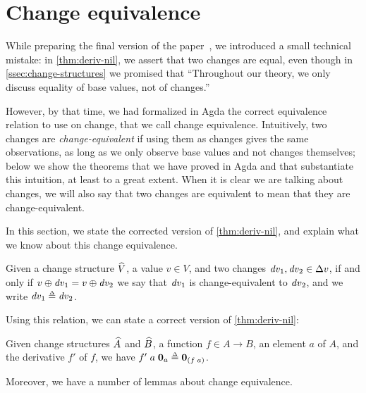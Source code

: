 \section{Change equivalence}
\label{sec:change-eq}

While preparing the final version of the paper~\citep{CaiEtAl2014ILC}, we introduced a
small technical mistake: in \cref{thm:deriv-nil}, we assert that
two changes are equal, even though in
\cref{ssec:change-structures} we promised that ``Throughout
our theory, we only discuss equality of base values, not of
changes.''

However, by that time, we had formalized in Agda the correct
equivalence relation to use on change, that we call change
equivalence. Intuitively, two changes are
\emph{change-equivalent} if using them as changes gives the same
observations, as long as we only observe base values and not
changes themselves; below we show the theorems that we have
proved in Agda and that substantiate this intuition, at least to
a great extent. When it is clear we are talking about changes, we
will also say that two changes are equivalent to mean that they
are change-equivalent.

In this section, we
state the corrected version of \cref{thm:deriv-nil}, and explain
what we know about this change equivalence.

\begin{definition}
  Given a change structure $\widehat{V}$, a value $v \in V$,
  and two changes $\D v_1, \D v_2 \in \Change{v}$, if and only if
  $\Update{v}{\D v_1} = \Update{v}{\D v_2}$ we say that $\mathit{dv}_1$
  is change-equivalent to $\mathit{dv}_2$, and
  we write $\D v_1 \Doe \D v_2$.
\end{definition}

Using this relation, we can state a correct version of
\cref{thm:deriv-nil}:

\begin{lemma}
  \label{thm:deriv-nil-2}
  Given change structures $\widehat{A}$ and
  $\widehat{B}$, a function $f \in A \to B$, an element $a$
  of $A$, and the derivative $f'$ of $f$, we have
  $\App{\App{f'}{a}}{\NilC{a}} \Doe \NilC{\App* f a}$.
\end{lemma}

Moreover, we have a number of lemmas about change
equivalence.


